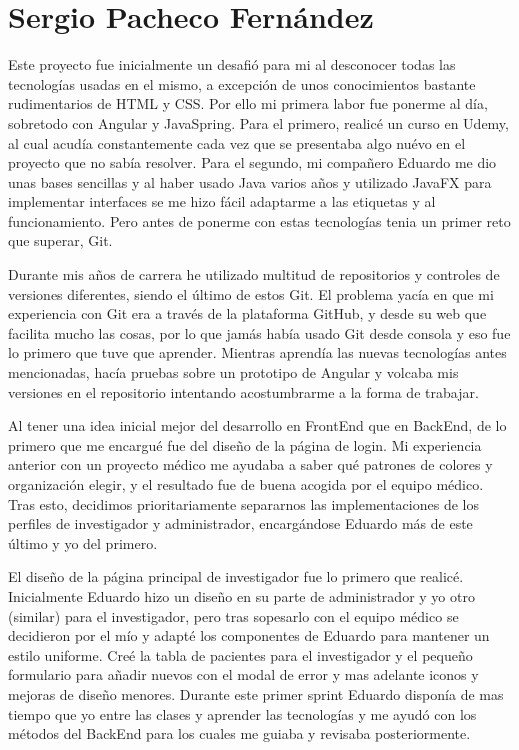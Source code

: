 \section{Sergio Pacheco Fernández}

Este proyecto fue inicialmente un desafió para mi al desconocer todas las tecnologías usadas en el mismo, a excepción de unos conocimientos bastante rudimentarios de HTML y CSS. Por ello mi primera labor fue ponerme al día, sobretodo con Angular y JavaSpring. Para el primero, realicé un curso en Udemy, al cual acudía constantemente cada vez que se presentaba algo nuévo en el proyecto que no sabía resolver. Para el segundo, mi compañero Eduardo me dio unas bases sencillas y al haber usado Java varios años y utilizado JavaFX para implementar interfaces se me hizo fácil adaptarme a las etiquetas y al funcionamiento. Pero antes de ponerme con estas tecnologías tenia un primer reto que superar, Git.\newline

Durante mis años de carrera he utilizado multitud de repositorios y controles de versiones diferentes, siendo el último de estos Git. El problema yacía en que mi experiencia con Git era a través de la plataforma GitHub, y desde su web que facilita mucho las cosas, por lo que jamás había usado Git desde consola y eso fue lo primero que tuve que aprender. Mientras aprendía las nuevas tecnologías antes mencionadas, hacía pruebas sobre un prototipo de Angular y volcaba mis versiones en el repositorio intentando acostumbrarme a la forma de trabajar.\newline

Al tener una idea inicial mejor del desarrollo en FrontEnd que en BackEnd, de lo primero que me encargué fue del diseño de la página de login. Mi experiencia anterior con un proyecto médico me ayudaba a saber qué patrones de colores y organización elegir, y el resultado fue de buena acogida por el equipo médico. Tras esto, decidimos prioritariamente separarnos las implementaciones de los perfiles de investigador y administrador, encargándose Eduardo más de este último y yo del primero.\newline

El diseño de la página principal de investigador fue lo primero que realicé. Inicialmente Eduardo hizo un diseño en su parte de administrador y yo otro (similar) para el investigador, pero tras sopesarlo con el equipo médico se decidieron por el mío y adapté los componentes de Eduardo para mantener un estilo uniforme. Creé la tabla de pacientes para el investigador y el pequeño formulario para añadir nuevos con el modal de error y mas adelante iconos y mejoras de diseño menores. Durante este primer sprint Eduardo disponía de mas tiempo que yo entre las clases y aprender las tecnologías y me ayudó con los métodos del BackEnd para los cuales me guiaba y revisaba posteriormente.\newline

